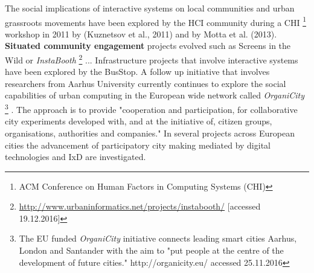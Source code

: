 The social implications of interactive systems on local communities and urban grassroots movements have been explored by the HCI community during a CHI \footnote{ACM Conference on Human Factors in Computing Systems (CHI)} workshop in 2011 by (Kuznetsov et al., 2011) and by Motta et al. (2013). \textbf{Situated community engagement} projects evolved such as Screens in the Wild or \textit{InstaBooth}  \footnote{\url{http://www.urbaninformatics.net/projects/instabooth/} [accessed 19.12.2016]} ... Infrastructure projects that involve interactive systems have been explored by the BusStop.
A follow up initiative that involves researchers from Aarhus University currently continues to explore the social capabilities of urban computing in the European wide network called \textit{OrganiCity} \footnote{The EU funded \textit{OrganiCity} initiative connects leading smart cities Aarhus, London and Santander with the aim to "put people at the centre of the development of future cities." http://organicity.eu/ accessed 25.11.2016} . 
The approach is to provide "cooperation and participation, for collaborative city experiments developed with, and at the initiative of, citizen groups, organisations, authorities and companies." In several projects across European cities the advancement of participatory city making mediated by digital technologies and IxD are investigated.



